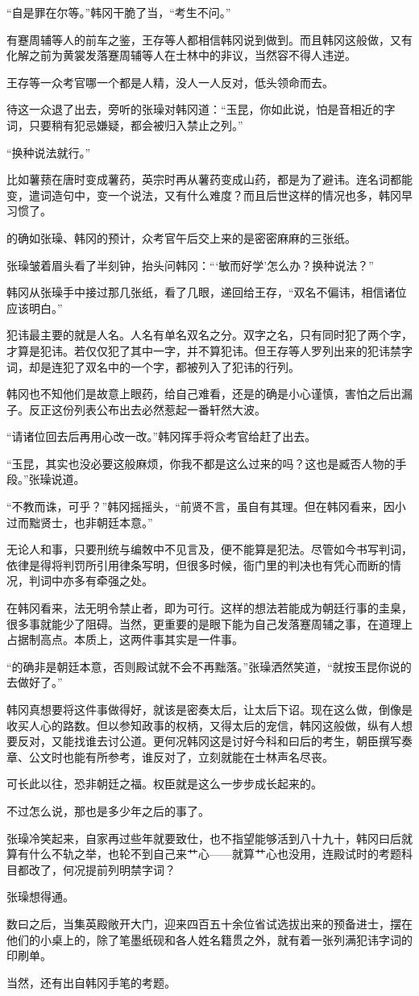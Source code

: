 “自是罪在尔等。”韩冈干脆了当，“考生不问。”

有蹇周辅等人的前车之鉴，王存等人都相信韩冈说到做到。而且韩冈这般做，又有化解之前为黄裳发落蹇周辅等人在士林中的非议，当然容不得人违逆。

王存等一众考官哪一个都是人精，没人一人反对，低头领命而去。

待这一众退了出去，旁听的张璪对韩冈道：“玉昆，你如此说，怕是音相近的字词，只要稍有犯忌嫌疑，都会被归入禁止之列。”

“换种说法就行。”

比如薯蓣在唐时变成薯药，英宗时再从薯药变成山药，都是为了避讳。连名词都能变，遣词造句中，变一个说法，又有什么难度？而且后世这样的情况也多，韩冈早习惯了。

的确如张璪、韩冈的预计，众考官午后交上来的是密密麻麻的三张纸。

张璪皱着眉头看了半刻钟，抬头问韩冈：“‘敏而好学’怎么办？换种说法？”

韩冈从张璪手中接过那几张纸，看了几眼，递回给王存，“双名不偏讳，相信诸位应该明白。”

犯讳最主要的就是人名。人名有单名双名之分。双字之名，只有同时犯了两个字，才算是犯讳。若仅仅犯了其中一字，并不算犯讳。但王存等人罗列出来的犯讳禁字词，却是连犯了双名中的一个字，都被列入了犯讳的行列。

韩冈也不知他们是故意上眼药，给自己难看，还是的确是小心谨慎，害怕之后出漏子。反正这份列表公布出去必然惹起一番轩然大波。

“请诸位回去后再用心改一改。”韩冈挥手将众考官给赶了出去。

“玉昆，其实也没必要这般麻烦，你我不都是这么过来的吗？这也是臧否人物的手段。”张璪说道。

“不教而诛，可乎？”韩冈摇摇头，“前贤不言，虽自有其理。但在韩冈看来，因小过而黜贤士，也非朝廷本意。”

无论人和事，只要刑统与编敇中不见言及，便不能算是犯法。尽管如今书写判词，依律是得将判罚所引用律条写明，但很多时候，衙门里的判决也有凭心而断的情况，判词中亦多有牵强之处。

在韩冈看来，法无明令禁止者，即为可行。这样的想法若能成为朝廷行事的圭臬，很多事就能少了阻碍。当然，更重要的是眼下能为自己发落蹇周辅之事，在道理上占据制高点。本质上，这两件事其实是一件事。

“的确非是朝廷本意，否则殿试就不会不再黜落。”张璪洒然笑道，“就按玉昆你说的去做好了。”

韩冈真想要将这件事做得好，就该是密奏太后，让太后下诏。现在这么做，倒像是收买人心的路数。但以参知政事的权柄，又得太后的宠信，韩冈这般做，纵有人想要反对，又能找谁去讨公道。更何况韩冈这是讨好今科和曰后的考生，朝臣撰写奏章、公文时也能有所参考，谁反对了，立刻就能在士林声名尽丧。

可长此以往，恐非朝廷之福。权臣就是这么一步步成长起来的。

不过怎么说，那也是多少年之后的事了。

张璪冷笑起来，自家再过些年就要致仕，也不指望能够活到八十九十，韩冈曰后就算有什么不轨之举，也轮不到自己来艹心——就算艹心也没用，连殿试时的考题科目都改了，何况提前列明禁字词？

张璪想得通。

数曰之后，当集英殿敞开大门，迎来四百五十余位省试选拔出来的预备进士，摆在他们的小桌上的，除了笔墨纸砚和各人姓名籍贯之外，就有着一张列满犯讳字词的印刷单。

当然，还有出自韩冈手笔的考题。
